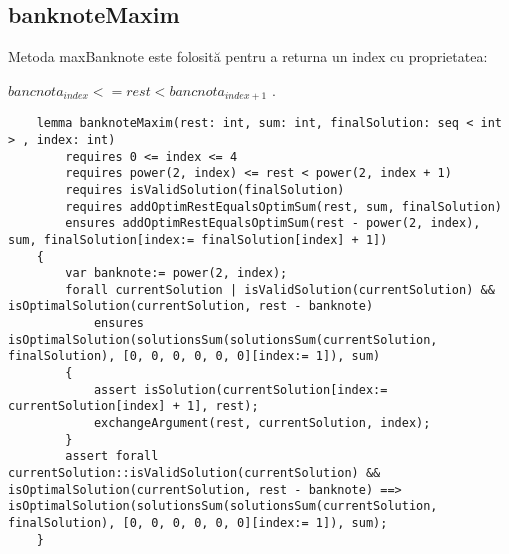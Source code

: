     \subsection{banknoteMaxim}
    Metoda maxBanknote este folosită pentru a returna un index cu proprietatea: \par
     $bancnota_{index} <= rest < bancnota_{index + 1}$  .
    \begin{lstlisting}
    lemma banknoteMaxim(rest: int, sum: int, finalSolution: seq < int > , index: int)
        requires 0 <= index <= 4
        requires power(2, index) <= rest < power(2, index + 1)
        requires isValidSolution(finalSolution)
        requires addOptimRestEqualsOptimSum(rest, sum, finalSolution)
        ensures addOptimRestEqualsOptimSum(rest - power(2, index), sum, finalSolution[index:= finalSolution[index] + 1]) 
    {
        var banknote:= power(2, index);
        forall currentSolution | isValidSolution(currentSolution) && isOptimalSolution(currentSolution, rest - banknote)
            ensures isOptimalSolution(solutionsSum(solutionsSum(currentSolution, finalSolution), [0, 0, 0, 0, 0, 0][index:= 1]), sum) 
        {
            assert isSolution(currentSolution[index:= currentSolution[index] + 1], rest);
            exchangeArgument(rest, currentSolution, index);
        }
        assert forall currentSolution::isValidSolution(currentSolution) && isOptimalSolution(currentSolution, rest - banknote) ==> isOptimalSolution(solutionsSum(solutionsSum(currentSolution, finalSolution), [0, 0, 0, 0, 0, 0][index:= 1]), sum);
    }
    \end{lstlisting}

